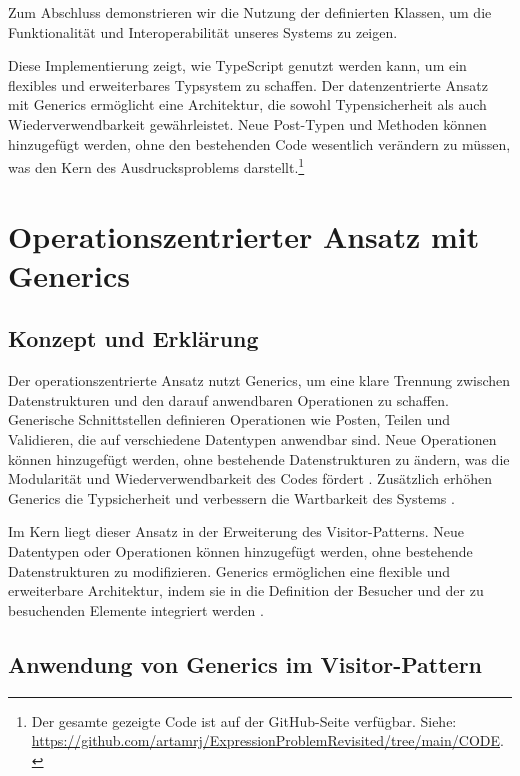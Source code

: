 \documentclass{easychair}
\begin{document}
Zum Abschluss demonstrieren wir die Nutzung der definierten Klassen, um die Funktionalität und Interoperabilität unseres Systems zu zeigen.



Diese Implementierung zeigt, wie TypeScript genutzt werden kann, um ein flexibles und erweiterbares Typsystem zu schaffen. Der datenzentrierte Ansatz mit Generics ermöglicht eine Architektur, die sowohl Typensicherheit als auch Wiederverwendbarkeit gewährleistet. Neue Post-Typen und Methoden können hinzugefügt werden, ohne den bestehenden Code wesentlich verändern zu müssen, was den Kern des Ausdrucksproblems darstellt.\footnote{Der gesamte gezeigte Code ist auf der GitHub-Seite verfügbar. Siehe: \url{https://github.com/artamrj/ExpressionProblemRevisited/tree/main/CODE}.}

\section{Operationszentrierter Ansatz mit Generics}


\subsection{Konzept und Erklärung}

Der operationszentrierte Ansatz nutzt Generics, um eine klare Trennung zwischen Datenstrukturen und den darauf anwendbaren Operationen zu schaffen. Generische Schnittstellen definieren Operationen wie Posten, Teilen und Validieren, die auf verschiedene Datentypen anwendbar sind. Neue Operationen können hinzugefügt werden, ohne bestehende Datenstrukturen zu ändern, was die Modularität und Wiederverwendbarkeit des Codes fördert \cite{torgersen2004expression}. Zusätzlich erhöhen Generics die Typsicherheit und verbessern die Wartbarkeit des Systems \cite{rozentals2019typescript}.

Im Kern liegt dieser Ansatz in der Erweiterung des Visitor-Patterns. Neue Datentypen oder Operationen können hinzugefügt werden, ohne bestehende Datenstrukturen zu modifizieren. Generics ermöglichen eine flexible und erweiterbare Architektur, indem sie in die Definition der Besucher und der zu besuchenden Elemente integriert werden \cite{wadler1998expression}.

\subsection{Anwendung von Generics im Visitor-Pattern}
\end{document}
